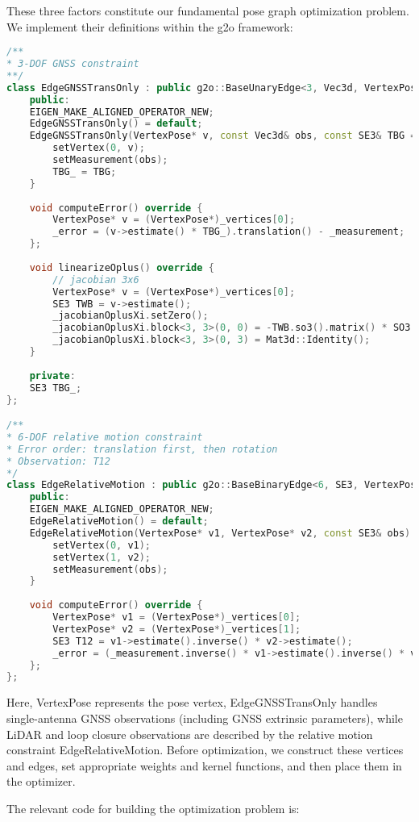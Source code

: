 These three factors constitute our fundamental pose graph optimization problem. We implement their definitions within the g2o framework:

\begin{lstlisting}[language=c++,caption=src/common/g2o\_types.h]
/**
* 3-DOF GNSS constraint
**/
class EdgeGNSSTransOnly : public g2o::BaseUnaryEdge<3, Vec3d, VertexPose> {
	public:
	EIGEN_MAKE_ALIGNED_OPERATOR_NEW;
	EdgeGNSSTransOnly() = default;
	EdgeGNSSTransOnly(VertexPose* v, const Vec3d& obs, const SE3& TBG = SE3()) {
		setVertex(0, v);
		setMeasurement(obs);
		TBG_ = TBG;
	}
	
	void computeError() override {
		VertexPose* v = (VertexPose*)_vertices[0];
		_error = (v->estimate() * TBG_).translation() - _measurement;
	};
	
	void linearizeOplus() override {
		// jacobian 3x6
		VertexPose* v = (VertexPose*)_vertices[0];
		SE3 TWB = v->estimate();
		_jacobianOplusXi.setZero();
		_jacobianOplusXi.block<3, 3>(0, 0) = -TWB.so3().matrix() * SO3::hat(TBG_.translation());
		_jacobianOplusXi.block<3, 3>(0, 3) = Mat3d::Identity();
	}
	
	private:
	SE3 TBG_;
};

/**
* 6-DOF relative motion constraint
* Error order: translation first, then rotation
* Observation: T12
*/
class EdgeRelativeMotion : public g2o::BaseBinaryEdge<6, SE3, VertexPose, VertexPose> {
	public:
	EIGEN_MAKE_ALIGNED_OPERATOR_NEW;
	EdgeRelativeMotion() = default;
	EdgeRelativeMotion(VertexPose* v1, VertexPose* v2, const SE3& obs) {
		setVertex(0, v1);
		setVertex(1, v2);
		setMeasurement(obs);
	}
	
	void computeError() override {
		VertexPose* v1 = (VertexPose*)_vertices[0];
		VertexPose* v2 = (VertexPose*)_vertices[1];
		SE3 T12 = v1->estimate().inverse() * v2->estimate();
		_error = (_measurement.inverse() * v1->estimate().inverse() * v2->estimate()).log();
	};
};
\end{lstlisting}

Here, VertexPose represents the pose vertex, EdgeGNSSTransOnly handles single-antenna GNSS observations (including GNSS extrinsic parameters), while LiDAR and loop closure observations are described by the relative motion constraint EdgeRelativeMotion. Before optimization, we construct these vertices and edges, set appropriate weights and kernel functions, and then place them in the optimizer.

The relevant code for building the optimization problem is:

